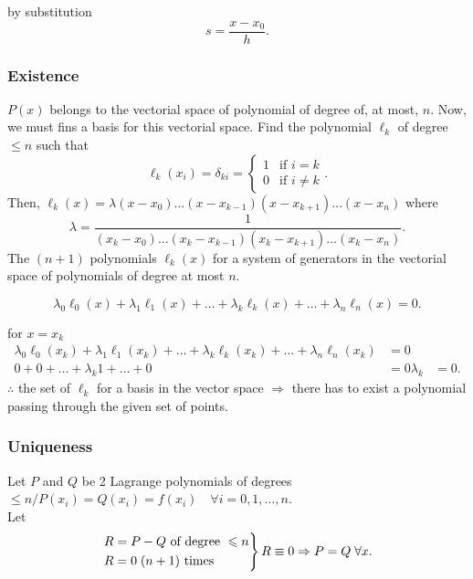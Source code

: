 \documentclass{report}
\begin{document}
by substitution
\[
	s = \frac{x-x_0}{h}
	.\]

\subsubsection{Existence}

\begin{myproof}
	$P(x)$ belongs to the vectorial space of polynomial of degree of, at most, $n$. Now, we must fins a basis for this vectorial space. Find the polynomial $\ell_k$ of degree $\leq n$ such that
	\[
		\ell_k(x_i) = \delta_{ki} = \begin{cases}
			1 & \text{if }i=k     \\
			0 & \text{if }i\neq k
		\end{cases}
		.\]
	Then, $\ell_k(x) = \lambda(x-x_0)\dots(x-x_{k-1})(x-x_{k+1})\dots(x-x_n)$
	where
	\[
		\lambda = \frac{1}{(x_k-x_0)\dots(x_k-x_{k-1})(x_k-x_{k+1})\dots(x_k-x_n)}
		.\]
	The $(n+1)$ polynomials $\ell_k(x)$ for a system of generators in the vectorial space of polynomials of degree at most $n$.

	\[
		\lambda_0\ell_0(x) + \lambda_1\ell_1(x) + \dots + \lambda_k\ell_k(x) + \dots + \lambda_n\ell_n(x) = 0
		.\]

	for $x=x_k$
	\begin{align*}
		\lambda_0\ell_0(x_k) + \lambda_1\ell_1(x_k) + \dots + \lambda_k\ell_k(x_k) + \dots + \lambda_n\ell_n(x_k) & = 0 \\
		0+0+\dots+\lambda_k1+\dots+0                                                                              & =0
		\lambda_k                                                                                                 & = 0
		.\end{align*}
	$\therefore$ the set of $\ell_k$ for a basis in the vector space $\Rightarrow$ there has to exist a polynomial passing through the given set of points.

\end{myproof}


\subsubsection{Uniqueness}

\begin{myproof}
	Let $P$ and $Q$ be 2 Lagrange polynomials of degrees $\leq n\Big/P(x_i)=Q(x_i)=f(x_i)\quad\forall i = 0,1,\dots,n$.\\
	Let
	\[
		\begin{rcases}
			R=P-Q \text{ of degree }\leq n\\
			R=0 \; (n+1) \text{ times}
		\end{rcases}R\equiv0\Rightarrow P=Q\;\forall x
		.\]
\end{myproof}
\end{document}
